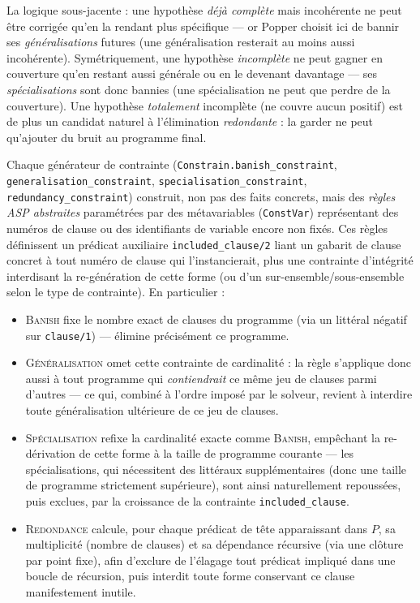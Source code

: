 La logique sous-jacente : une hypothèse \emph{déjà complète} mais
incohérente ne peut être corrigée qu'en la rendant plus spécifique ---
or Popper choisit ici de bannir ses \emph{généralisations} futures (une
généralisation resterait au moins aussi incohérente). Symétriquement,
une hypothèse \emph{incomplète} ne peut gagner en couverture qu'en
restant aussi générale ou en le devenant davantage --- ses
\emph{spécialisations} sont donc bannies (une spécialisation ne peut
que perdre de la couverture). Une hypothèse \emph{totalement}
incomplète (ne couvre aucun positif) est de plus un candidat naturel à
l'élimination \emph{redondante} : la garder ne peut qu'ajouter du bruit
au programme final.

Chaque générateur de contrainte (\texttt{Constrain.banish\_constraint},
\texttt{generalisation\_constraint}, \texttt{specialisation\_constraint},
\texttt{redundancy\_constraint}) construit, non pas des faits concrets,
mais des \emph{règles ASP abstraites} paramétrées par des
métavariables (\texttt{ConstVar}) représentant des numéros de clause ou
des identifiants de variable encore non fixés. Ces règles définissent un
prédicat auxiliaire \texttt{included\_clause/2} liant un \og gabarit \fg{}
de clause concret à tout numéro de clause qui l'instancierait, plus une
contrainte d'intégrité interdisant la re-génération de cette forme (ou
d'un sur-ensemble/sous-ensemble selon le type de contrainte). En
particulier :

\begin{itemize}
  \item \textsc{Banish} fixe le nombre exact de clauses du programme
    (via un littéral négatif sur \texttt{clause/1}) --- élimine
    précisément ce programme.
  \item \textsc{Généralisation} omet cette contrainte de cardinalité :
    la règle s'applique donc aussi à tout programme qui
    \emph{contiendrait} ce même jeu de clauses parmi d'autres --- ce
    qui, combiné à l'ordre imposé par le solveur, revient à interdire
    toute généralisation ultérieure de ce jeu de clauses.
  \item \textsc{Spécialisation} refixe la cardinalité exacte comme
    \textsc{Banish}, empêchant la re-dérivation de cette forme à la
    taille de programme courante --- les spécialisations, qui
    nécessitent des littéraux supplémentaires (donc une taille de
    programme strictement supérieure), sont ainsi naturellement
    repoussées, puis exclues, par la croissance de la contrainte
    \texttt{included\_clause}.
  \item \textsc{Redondance} calcule, pour chaque prédicat de tête
    apparaissant dans $P$, sa multiplicité (nombre de clauses) et sa
    dépendance récursive (via une clôture par point fixe), afin
    d'exclure de l'élagage tout prédicat impliqué dans une boucle de
    récursion, puis interdit toute forme conservant ce clause
    manifestement inutile.
\end{itemize}

